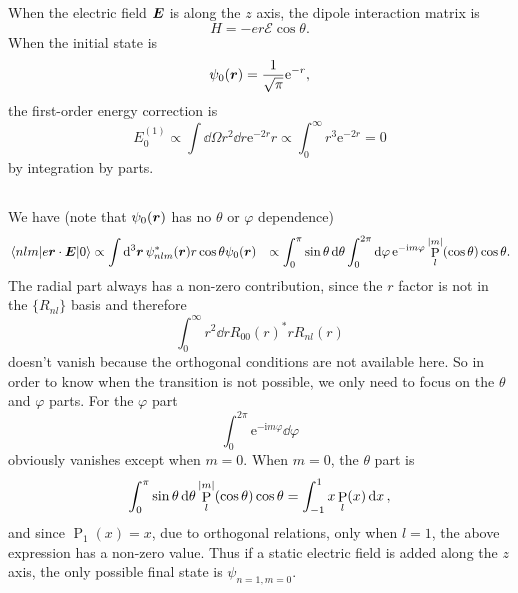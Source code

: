 \documentclass[hyperref, a4paper]{article}
\DeclareMathOperator{\legpoly}{P}
\newcommand*{\ii}{\mathrm{i}}
\newcommand*{\ee}{\mathrm{e}}
\def\\{}%
\begin{document}
\section{}

\subsection{}

When the electric field $\vb*{E}$ is along the $z$ axis, 
the dipole interaction matrix is 
\begin{equation}
    H = - e r \mathcal{E} \cos \theta .
    \label{eq:dipole}
\end{equation}
When the initial state is 
\begin{equation}
    \psi_0(\vb*{r}) = \frac{1}{\sqrt{\pi}} \ee^{- r},
\end{equation}
the first-order energy correction is
\begin{equation}
    E_0^{(1)} \propto \int \dd{\Omega} r^2 \dd{r} \ee^{- 2 r} r 
    \propto \int_{0}^{\infty} r^3 \ee^{- 2 r} 
    = 0
\end{equation}
by integration by parts.

\subsection{}

We have (note that $\psi_0(\vb*{r})$ has no $\theta$ or $\varphi$ dependence)
\begin{equation}
    \begin{aligned}
        \mel{n l m}{e \vb*{r} \cdot \vb*{E}}{0} 
        &\propto \int \dd[3]{\vb*{r}} \psi_{n l m}^*(\vb*{r}) r \cos \theta \psi_0(\vb*{r}) \\
        &\propto \int_{0}^{\pi} \sin \theta \dd{\theta} \int_{0}^{2\pi} \dd{\varphi}
        \ee^{- \ii m \varphi} \legpoly_l^{\abs{m}}(\cos \theta) \cos \theta .
    \end{aligned}
\end{equation}
The radial part always has a non-zero contribution, 
since the $r$ factor is not in the $\{R_{nl}\}$ basis 
and therefore 
\[
    \int_{0}^{\infty} r^2 \dd{r} R_{00}(r)^* r R_{nl}(r)
\]
doesn't vanish because the orthogonal conditions 
are not available here.
So in order to know when the transition is not possible,
we only need to focus on the $\theta$ and $\varphi$ parts.
For the $\varphi$ part
\[
    \int_{0}^{2\pi} \ee^{- \ii m \varphi} \dd{\varphi}
\]
obviously vanishes except when $m = 0$.
When $m = 0$, the $\theta$ part is 
\[
    \int_{0}^{\pi} \sin \theta \dd{\theta} \legpoly_l^{\abs{m}}(\cos \theta) \cos \theta 
    = \int_{-1}^{1} x \legpoly_l(x) \dd{x} ,
\]
and since $\legpoly_1(x) = x$, 
due to orthogonal relations, only when $l = 1$, 
the above expression has a non-zero value.
Thus if a static electric field is added along the $z$ axis, 
the only possible final state
is $\psi_{n = 1, m = 0}$.
\end{document}
